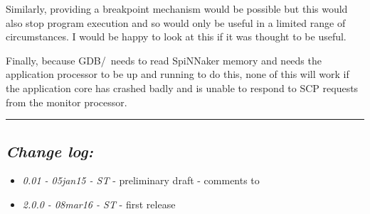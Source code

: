 Similarly, providing a breakpoint mechanism would be possible but this
would also stop program execution and so would only be useful in a
limited range of circumstances. I would be happy to look at this if it
was thought to be useful.

Finally, because GDB/\gdbspin\ needs to read SpiNNaker memory and
needs the application processor to be up and running to do this, none
of this will work if the application core has crashed badly and is
unable to respond to SCP requests from the monitor processor.

\rule{\linewidth}{1pt}

\subsection{\itshape Change log:}

\begin{itemize}
\item {\itshape 0.01 - 05jan15 - ST} - preliminary draft - comments to
  {\itshape \Email}
\item {\itshape 2.0.0 - 08mar16 - ST} - first release
\end{itemize}


